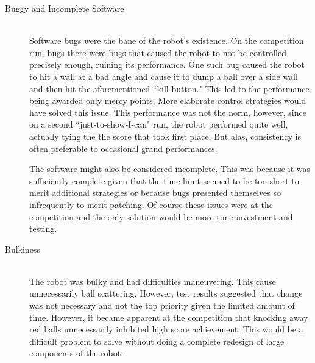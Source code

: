 \documentclass{article}
\begin{document}
\begin{description}
  \item[Buggy and Incomplete Software] \hfill \\
  Software bugs were the bane of the robot's existence. On the competition run, bugs there were bugs that caused the robot to not be controlled precisely enough, ruining its performance. One such bug caused the robot to hit a wall at a bad angle and cause it to dump a ball over a side wall and then hit the aforementioned ``kill button." This led to the performance being awarded only mercy points. More elaborate control strategies would have solved this issue. This performance was not the norm, however, since on a second ``just-to-show-I-can" run, the robot performed quite well, actually tying the the score that took first place. But alas, consistency is often preferable to occasional grand performances.

  The software might also be considered incomplete. This was because it was sufficiently complete given that the time limit seemed to be too short to merit additional strategies or because bugs presented themselves so infrequently to merit patching. Of course these issues were at the competition and the only solution would be more time investment and testing.  


  \item[Bulkiness] \hfill \\
  The robot was bulky and had difficulties maneuvering. This cause unnecessarily ball scattering. However, test results suggested that change was not necessary and not the top priority given the limited amount of time. However, it became apparent at the competition that knocking away red balls unnecessarily inhibited high score achievement. This would be a difficult problem to solve without doing a complete redesign of large components of the robot. 
\end{description}
\end{document}
